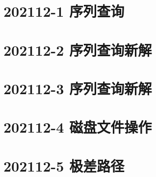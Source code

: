 \documentclass[cn,10pt,math=newtx,citestyle=gb7714-2015,bibstyle=gb7714-2015]{elegantbook}
\newif\ifonlyanalyze %
\begin{document}
\newpage
\section{202112-1 序列查询}
\ifonlyanalyze
\else
  
\fi


\newpage
\section{202112-2 序列查询新解}
\ifonlyanalyze
\else
  
\fi


\newpage
\section{202112-3 序列查询新解}
\ifonlyanalyze
\else
  
\fi


\newpage
\section{202112-4 磁盘文件操作}
\ifonlyanalyze
\else
  
\fi


\newpage
\section{202112-5 极差路径}
\ifonlyanalyze
\else
  
\fi

\end{document}
